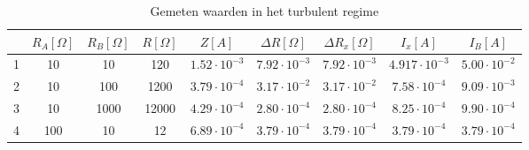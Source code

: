 \begin{table}
    \centering
    \label{tab:Lamflow}
    \caption{Gemeten waarden in het turbulent regime}
    \begin{tabular}{| c | c | c | c | c | c | c | c | c |}
        \hline
                & $R_A [\Omega]$    & $R_B [\Omega]$    & $R [\Omega]$  & $Z [A]$               & $\Delta R [\Omega]$   & $\Delta R_x [\Omega]$ & $I_x [A]$                 & $I_B [A]$             \\ \hline
        1       & 10                & 10                & 120           & $1.52 \cdot 10^{-3}$  & $7.92 \cdot 10^{-3} $ & $7.92 \cdot 10^{-3} $ & $4.917 \cdot 10^{-3}$     & $5.00 \cdot 10^{-2} $ \\ \hline
        2       & 10                & 100               & 1200          & $3.79 \cdot 10^{-4}$  & $3.17 \cdot 10^{-2}$  & $3.17 \cdot 10^{-2}$  & $7.58 \cdot 10^{-4}$      & $9.09 \cdot 10^{-3}$  \\ \hline   
        3       & 10                & 1000              & 12000         & $4.29 \cdot 10^{-4}$  & $2.80 \cdot 10^{-4}$  & $2.80 \cdot 10^{-4}$  & $8.25 \cdot 10^{-4}$      & $9.90 \cdot 10^{-4}$  \\ \hline
        4       & 100               & 10                & 12            & $6.89 \cdot 10^{-4}$  & $3.79 \cdot 10^{-4}$  & $3.79 \cdot 10^{-4}$  & $3.79 \cdot 10^{-4}$      & $3.79 \cdot 10^{-4}$  \\ \hline
    \end{tabular}
\end{table}